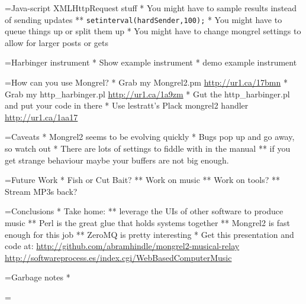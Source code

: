 \documentclass[titlepage,usenames,a4,landscape,semhelv]{seminar}
\begin{document}
\begin{slide}
=Java-script XMLHttpRequest stuff
* You might have to sample results instead of sending updates
** \texttt{setinterval(hardSender,100);}
* You might have to queue things up or split them up
* You might have to change mongrel settings to allow for 
  larger posts or gets

=Harbinger instrument
* Show example instrument
* demo example instrument

=How can you use Mongrel?
* Grab my Mongrel2.pm \url{http://ur1.ca/17bmn}
* Grab my http\_harbinger.pl \url{http://ur1.ca/1a9zm}
* Gut the http\_harbinger.pl and put your code in there
* Use lestratt's Plack mongrel2 handler \url{http://ur1.ca/1aa17}

=Caveats
* Mongrel2 seems to be evolving quickly
* Bugs pop up and go away, so watch out
* There are lots of settings to fiddle with in the manual
** if you get strange behaviour maybe your buffers are not big enough.

=Future Work
* Fish or Cut Bait?
** Work on music
** Work on tools?
** Stream MP3s back?

=Conclusions
* Take home:
** leverage the UIs of other software to produce music
** Perl is the great glue that holds systems together
** Mongrel2 is fast enough for this job
** ZeroMQ is pretty interesting
* Get this presentation and code at: 
{\tiny
\url{http://github.com/abramhindle/mongrel2-musical-relay}
\url{http://softwareprocess.es/index.cgi/WebBasedComputerMusic}
}

=Garbage notes
* 

=
\end{slide}
\end{document}
